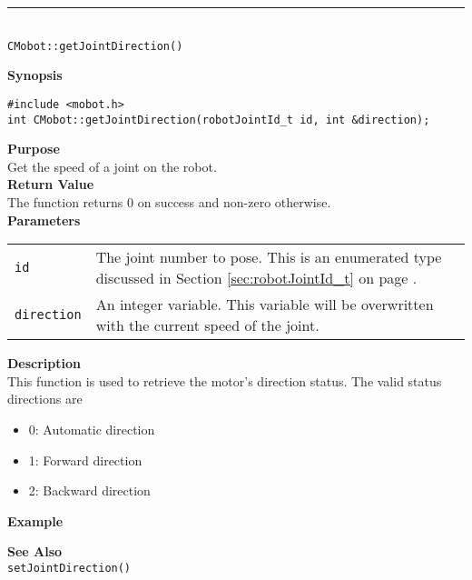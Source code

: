 \noindent
\vspace{5pt}
\rule{4.5in}{0.015in}\\
\noindent
{\LARGE \texttt{CMobot::getJointDirection()}}\\
{}

\noindent
{\bf Synopsis}
\begin{verbatim}
#include <mobot.h>
int CMobot::getJointDirection(robotJointId_t id, int &direction);
\end{verbatim}

\noindent
{\bf Purpose}\\
Get the speed of a joint on the robot.\\

\noindent
{\bf Return Value}\\
The function returns 0 on success and non-zero otherwise.\\

\noindent
{\bf Parameters}
\vspace{-0.1in}
\begin{description}
\item               
\begin{tabular}{p{10 mm}p{145 mm}}
\texttt{id} & The joint number to pose. This is an enumerated type 
discussed in Section \ref{sec:robotJointId_t} on page
\pageref{sec:robotJointId_t}.\\
\texttt{direction} & An integer variable. This variable will be overwritten
with the current speed of the joint.
\end{tabular}
\end{description}

\noindent
{\bf Description}\\
This function is used to retrieve the motor's direction status. The valid
status directions are
\begin{itemize}
\item 0: Automatic direction
\item 1: Forward direction
\item 2: Backward direction
\end{itemize}

\noindent
{\bf Example}\\
\noindent

\noindent
{\bf See Also}\\
\texttt{setJointDirection()}

